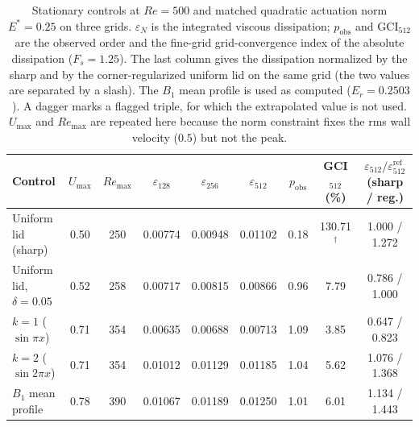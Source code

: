\documentclass[11pt,a4paper]{article}
\begin{document}
\begin{table}[t]
\centering
\caption{Stationary controls at $Re=500$ and matched quadratic actuation norm
$E^\ast=0.25$ on three grids. $\varepsilon_N$ is the integrated viscous
dissipation; $p_{\mathrm{obs}}$ and $\mathrm{GCI}_{512}$ are the observed order
and the fine-grid grid-convergence index of the absolute dissipation
($F_s=1.25$). The last column gives the dissipation normalized by the sharp
and by the corner-regularized uniform lid on the same grid (the two values are
separated by a slash). The $B_1$ mean profile
is used as computed ($E_r=0.2503$). A dagger marks a flagged triple, for which
the extrapolated value is not used. $U_{\max}$ and $Re_{\max}$ are repeated here
because the norm constraint fixes the rms wall velocity ($0.5$) but not the peak.}
\label{tab:stationary}
\footnotesize
\setlength{\tabcolsep}{4pt}
\begin{tabular}{lcccccccc}
\toprule
Control & $U_{\max}$ & $Re_{\max}$ & $\varepsilon_{128}$ & $\varepsilon_{256}$ & $\varepsilon_{512}$
& $p_{\mathrm{obs}}$ & GCI$_{512}$ (\%) & $\varepsilon_{512}/\varepsilon^{\mathrm{ref}}_{512}$ (sharp / reg.)\\
\midrule
Uniform lid (sharp) & 0.50 & 250 & 0.00774 & 0.00948 & 0.01102 & 0.18 & 130.71$^{\dagger}$ & 1.000 / 1.272\\
Uniform lid, $\delta=0.05$ & 0.52 & 258 & 0.00717 & 0.00815 & 0.00866 & 0.96 & 7.79 & 0.786 / 1.000\\
$k=1$ ($\sin\pi x$) & 0.71 & 354 & 0.00635 & 0.00688 & 0.00713 & 1.09 & 3.85 & 0.647 / 0.823\\
$k=2$ ($\sin 2\pi x$) & 0.71 & 354 & 0.01012 & 0.01129 & 0.01185 & 1.04 & 5.62 & 1.076 / 1.368\\
$B_1$ mean profile & 0.78 & 390 & 0.01067 & 0.01189 & 0.01250 & 1.01 & 6.01 & 1.134 / 1.443\\
\bottomrule
\end{tabular}
\end{table}
\end{document}
